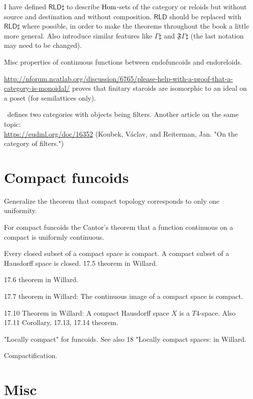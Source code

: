 \documentclass{amsart}
\begin{document}
I have defined $\mathsf{RLD}\sharp$ to describe $\operatorname{Hom}$-sets of the category or reloids but without source and destination and without composition.
$\mathsf{RLD}$ should be replaced with $\mathsf{RLD}\sharp$ where possible, in order to make the theorems throughout the book a little more general.
Also introduce similar features like $\Gamma\sharp$ and $\mathfrak{F}\Gamma\sharp$ (the last notation may need to be changed).

Misc properties of continuous functions between endofuncoids and endoreloids.

\url{http://nforum.ncatlab.org/discussion/6765/please-help-with-a-proof-that-a-category-is-monoidal/} proves that
finitary staroids are isomorphic to an ideal on a poset (for semilattices only).

\cite{filt-cat}~defines two categories with objects being filters. Another article on the same topic:\\
\url{https://eudml.org/doc/16352} (Koubek, V\'aclav, and Reiterman, Jan. "On the category of filters.")


\section{Compact funcoids}

Generalize the theorem that compact topology corresponds to only one uniformity.

For compact funcoids the Cantor's theorem that a function continuous on a compact is uniformly continuous.

Every closed subset of a compact space is compact. A compact subset of a Hausdorff space is closed. 17.5 theorem in Willard.

17.6 theorem in Willard.

17.7 theorem in Willard: The continuous image of a compact space is compact.

17.10 Theorem in Willard: A compact Hausdorff space $X$ is a $T 4$-space. Also 17.11 Corollary, 17.13, 17.14 theorem.

"Locally compact" for funcoids. See also 18 "Locally compact spaces: in Willard.

Compactification.

\section{Misc}
\end{document}
